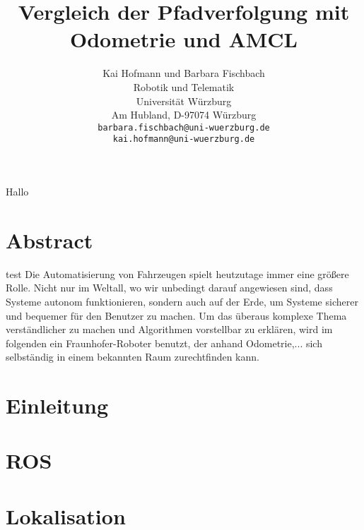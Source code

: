 \documentclass[11pt,a4paper]{article}
\begin{document}
\sloppy
	
Hallo 


\title{\Large\bf Vergleich der Pfadverfolgung mit Odometrie und AMCL }

\author{Kai Hofmann und Barbara Fischbach\\
  Robotik und Telematik \\
  Universit\"at W\"urzburg\\
  Am Hubland, D-97074 W\"urzburg\\
{\small \texttt{barbara.fischbach@uni-wuerzburg.de}}\\
{\small \texttt{kai.hofmann@uni-wuerzburg.de}}}

\date{}




\maketitle

\newpage

\tableofcontents{}

\newpage

\twocolumn

\section*{Abstract}
{
test
Die Automatisierung von Fahrzeugen spielt heutzutage immer eine gr\"o\ss{}ere Rolle. Nicht nur im Weltall, wo wir unbedingt darauf angewiesen sind, dass Systeme autonom funktionieren, sondern auch auf der Erde, um Systeme sicherer und bequemer f\"ur den Benutzer zu machen. Um das überaus komplexe Thema verst\"andlicher zu machen und Algorithmen vorstellbar zu erkl\"aren, wird im folgenden ein Fraunhofer-Roboter benutzt, der anhand Odometrie,... sich selbst\"andig in einem bekannten Raum zurechtfinden kann.}


\section{Einleitung}

\section{ROS}

\section{Lokalisation}
\end{document}
